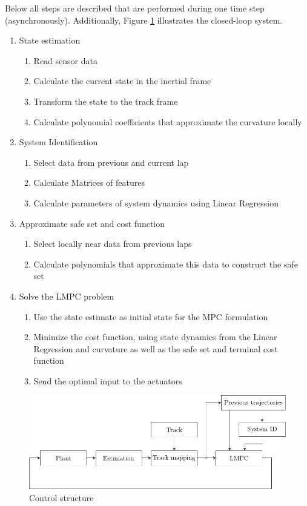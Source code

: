 Below all steps are described that are performed during one time step (asynchronously). Additionally, Figure \ref{fig:controlStructure} illustrates the closed-loop system.
\begin{enumerate}
\item State estimation
\begin{enumerate}
\item Read sensor data
\item Calculate the current state in the inertial frame
\item Transform the state to the track frame
\item Calculate polynomial coefficients that approximate the curvature locally
\end{enumerate}
\item System Identification
\begin{enumerate}
\item Select data from previous and current lap
\item Calculate Matrices of features
\item Calculate parameters of system dynamics using Linear Regression
\end{enumerate}
\item Approximate safe set and cost function
\begin{enumerate}
\item Select locally near data from previous laps
\item Calculate polynomials that approximate this data to construct the safe set
\end{enumerate}
\item Solve the LMPC problem
\begin{enumerate}
\item Use the state estimate as initial state for the MPC formulation
\item Minimize the cost function, using state dynamics from the Linear Regression and curvature as well as the safe set and terminal cost function
\item Send the optimal input to the actuators
\end{enumerate}
\end{enumerate}

\begin{figure}[ht]
    \centering
  \includegraphics{../../Figures/Illustrator/ControlDiagram.pdf}
    \caption{Control structure}
    \label{fig:controlStructure}
\end{figure}

